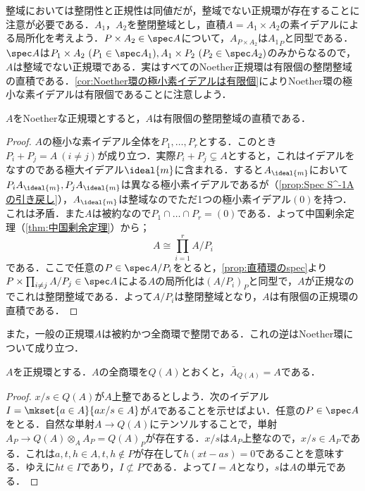 整域においては整閉性と正規性は同値だが，整域でない正規環が存在することに注意が必要である．$A_1，A_2$を整閉整域とし，直積$A=A_1\times A_2$の素イデアルによる局所化を考えよう．$P\times A_2\in\spec A$について，$A_{P\times A_2}$は${A_1}_{P}$と同型である．$\spec A$は$P_1\times A_2~(P_1\in\spec A_1),A_1\times P_2~(P_2\in\spec A_2)$のみからなるので，$A$は整域でない正規環である．実はすべてのNoether正規環は有限個の整閉整域の直積である．\ref{cor:Noether環の極小素イデアルは有限個}によりNoether環の極小な素イデアルは有限個であることに注意しよう．

\begin{thm}
	$A$をNoetherな正規環とすると，$A$は有限個の整閉整域の直積である．
\end{thm}

\begin{proof}
	$A$の極小な素イデアル全体を$P_1,\dots,P_r$とする．このとき$P_i+P_j=A~(i\neq j)$が成り立つ．実際$P_i+P_j\subsetneq A$とすると，これはイデアルをなすのである極大イデアル$\ideal{m}$に含まれる．すると$A_{\ideal{m}}$において$P_iA_{\ideal{m}},P_jA_{\ideal{m}}$は異なる極小素イデアルであるが（\ref{prop:Spec S^-1Aの引き戻し}），$A_{\ideal{m}}$は整域なのでただ1つの極小素イデアル$(0)$を持つ．これは矛盾．また$A$は被約なので$P_1\cap\dots\cap P_r=(0)$である．よって中国剰余定理（\ref{thm:中国剰余定理}）から；
	\[A\cong \prod_{i=1}^r A/P_i\]
	である．ここで任意の$P\in\spec A/P_i$をとると，\ref{prop:直積環のspec}より$P\times\prod_{i\neq j}A/P_j\in\spec A$による$A$の局所化は$(A/P_i)_P$と同型で，$A$が正規なのでこれは整閉整域である．よって$A/P_i$は整閉整域となり，$A$は有限個の正規環の直積である．
\end{proof}

また，一般の正規環$A$は被約かつ全商環で整閉である．これの逆はNoether環について成り立つ．

\begin{prop}\label{prop:正規なら全商環で整閉}
	$A$を正規環とする．$A$の全商環を$Q(A)$とおくと，$\bar{A}_{Q(A)}=A$である．
\end{prop}

\begin{proof}
	$x/s\in Q(A)$が$A$上整であるとしよう．次のイデアル$I=\mkset{a\in A}{ax/s\in A}$が$A$であることを示せばよい．任意の$P\in\spec A$をとる．自然な単射$A\to Q(A)$にテンソルすることで，単射$A_P\to Q(A)\otimes_A A_P=Q(A)_P$が存在する．$x/s$は$A_P$上整なので，$x/s\in A_P$である．これは$a,t,h\in A,t,h\not\in P$が存在して$h(xt-as)=0$であることを意味する．ゆえに$ht\in I$であり，$I\not\subset P$である．よって$I=A$となり，$s$は$A$の単元である．
\end{proof}

